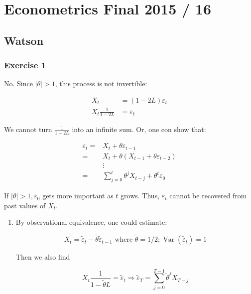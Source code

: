 \section{Econometrics Final 2015 / 16}

{
\subsection*{Watson}

{
\subsubsection*{Exercise 1}

\begin{enumerate}[label=(\alph*)]
{\item 
No. Since $|\theta|>1$, this process is not invertible:

$$
\begin{aligned}
X_{t} & =(1-2 L) \varepsilon_{t} \\
X_{t} \frac{1}{1-2 L} & =\varepsilon_{t}
\end{aligned}
$$

We cannot turn $\frac{1}{1-2 L}$ into an infinite sum. Or, one con show that:

$$
\begin{aligned}
\varepsilon_{t} =& X_{t}+\theta \varepsilon_{t-1} \\
=& X_{t}+\theta\left(X_{t-1}+\theta \varepsilon_{t-2}\right) \\
&\vdots \\
=& \sum_{j=0}^{t} \theta^{j} X_{t-j}+\theta^{t} \varepsilon_{0}
\end{aligned}
$$

If $|\theta|>1, \varepsilon_{0}$ gets more important as $t$ grows. Thus, $\varepsilon_{t}$ cannot be recovered from past values of $X_{t}$.
}
{\item 
\begin{enumerate}[label=(\roman*)]
    \item 
    By observational equivalence, one could estimate:
    
    $$
    X_{t}=\tilde{\varepsilon}_{t}-\tilde{\theta} \tilde{\varepsilon}_{t-1} \text { where } \tilde{\theta}=1 / 2 ; \operatorname{Var}\left(\tilde{\varepsilon}_{t}\right)=1
    $$
    
    Then we also find
    
    $$
    X_{t} \frac{1}{1-\tilde{\theta}L}=\tilde{\varepsilon}_{t} \Rightarrow \tilde{\varepsilon}_{T}=\sum_{j=0}^{T-1} \tilde{\theta}^{j} X_{T-j}
    $$
    

\end{enumerate}}
\end{enumerate}}}

